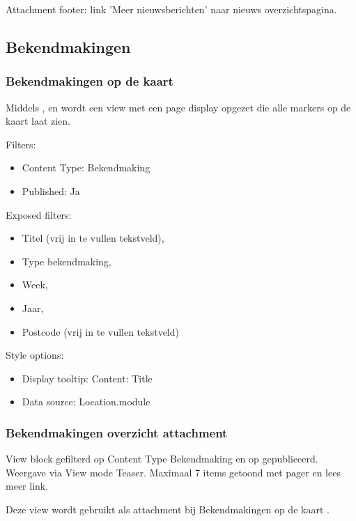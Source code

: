 Attachment footer: link 'Meer nieuwsberichten' naar nieuws overzichtspagina.

\subsection{Bekendmakingen}
\subsubsection{Bekendmakingen op de kaart}\label{bekendmakingen-markers}

Middels ,  en  wordt een view met een page display opgezet die alle markers op de kaart laat zien.

Filters:
\begin{itemize}
\item Content Type: Bekendmaking
\item Published: Ja
\end{itemize}

Exposed filters:
\begin{itemize}
\item Titel (vrij in te vullen tekstveld),
\item Type bekendmaking,
\item Week,
\item Jaar,
\item Postcode (vrij in te vullen tekstveld)
\end{itemize}

Style options:
\begin{itemize}
\item Display tooltip: Content: Title
\item Data source: Location.module
\end{itemize}

\subsubsection{Bekendmakingen overzicht attachment}\label{bekendmakingen-overzicht}

View block gefilterd op Content Type Bekendmaking en op gepubliceerd. Weergave via View mode Teaser. Maximaal 7 items getoond met pager en lees meer link.

Deze view wordt gebruikt als attachment bij Bekendmakingen op de kaart .